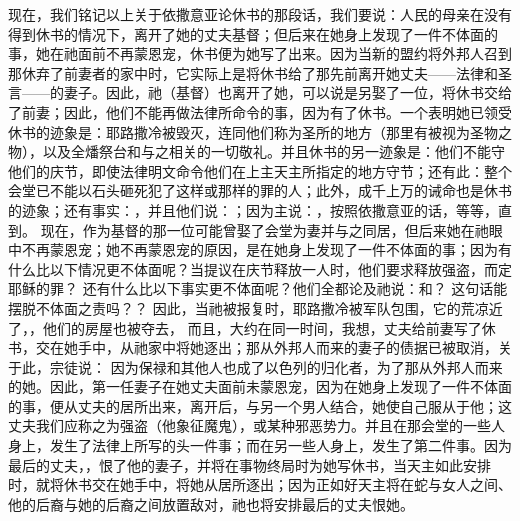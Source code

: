 现在，我们铭记以上关于依撒意亚论休书的那段话，我们要说：人民的母亲在没有得到休书的情况下，离开了她的丈夫基督；但后来在她身上发现了一件不体面的事，她在祂面前不再蒙恩宠，休书便为她写了出来。因为当新的盟约将外邦人召到那休弃了前妻者的家中时，它实际上是将休书给了那先前离开她丈夫——法律和圣言——的妻子。因此，祂（基督）也离开了她，可以说是另娶了一位，将休书交给了前妻；因此，他们不能再做法律所命令的事，因为有了休书。一个表明她已领受休书的迹象是：耶路撒冷被毁灭，连同他们称为圣所的地方（那里有被视为圣物之物），以及全燔祭台和与之相关的一切敬礼。并且休书的另一迹象是：他们不能守他们的庆节，即使法律明文命令他们在上主天主所指定的地方守节；还有此：整个会堂已不能以石头砸死犯了这样或那样的罪的人；此外，成千上万的诫命也是休书的迹象；还有事实：，并且他们说：；因为主说：，按照依撒意亚的话，等等，直到。 现在，作为基督的那一位可能曾娶了会堂为妻并与之同居，但后来她在祂眼中不再蒙恩宠；她不再蒙恩宠的原因，是在她身上发现了一件不体面的事；因为有什么比以下情况更不体面呢？当提议在庆节释放一人时，他们要求释放强盗，而定耶稣的罪？ 还有什么比以下事实更不体面呢？他们全都论及祂说：和？ 这句话能摆脱不体面之责吗？？ 因此，当祂被报复时，耶路撒冷被军队包围，它的荒凉近了，，他们的房屋也被夺去， 而且，大约在同一时间，我想，丈夫给前妻写了休书，交在她手中，从祂家中将她逐出；那从外邦人而来的妻子的债据已被取消，关于此，宗徒说： 因为保禄和其他人也成了以色列的归化者，为了那从外邦人而来的她。因此，第一任妻子在她丈夫面前未蒙恩宠，因为在她身上发现了一件不体面的事，便从丈夫的居所出来，离开后，与另一个男人结合，她使自己服从于他；这丈夫我们应称之为强盗（他象征魔鬼），或某种邪恶势力。并且在那会堂的一些人身上，发生了法律上所写的头一件事；而在另一些人身上，发生了第二件事。因为最后的丈夫，，恨了他的妻子，并将在事物终局时为她写休书，当天主如此安排时，就将休书交在她手中，将她从居所逐出；因为正如好天主将在蛇与女人之间、他的后裔与她的后裔之间放置敌对，祂也将安排最后的丈夫恨她。\par


